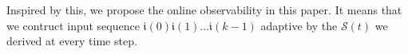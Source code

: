 \begin{comment}
 The input \Input$(t)$ we chose should make every two distinct states \State$^{i}(t)$ , \State$^{j}(t)$$\in$ \Ustate$(t)$ will not turn into be the same state after affected by \Input$(t)$.  \ly{Therefore,   there is exact one $s\in $ \Ustate$(t)$ such that $s\xrightarrow
{i(t)} s_1$ for each $s_1\in $ \Ustate$(t+1)$.} And the \Ustate$(t+1)$ is derived by the input \Input$(t)$ and \Output$(t+1)$, and we have $|$\Ustate$(t+1)$$|\le|$\Ustate$(t)$$|$. If $|$\Ustate$(t+1)$$|=1$,  we can determine \State$(t+1)$.  Employing the update rules and \Input$(t)$, we can determine the  \State$(t)$.  Repeating this step, we  determine the initial state \State$(0)$ of the \BCN.
\end{comment}

\begin{comment} 
But we can also determine the set of possible initial states \Ustate$(0)$ by initial output \Output$(0)$ we observe, and then we can use different input sequences (\Input$^{1}(0)$\Input$^{1}(1)\ldots$\Input$^{1}(k)$, \Input$^{2}(0)$\Input$^{2}(1)\ldots$\Input$^{2}(k)$, $\ldots$) to determine initial state for different sets of possible initial states (\Ustate$^{1}(0)$, \Ustate$^{2}(0)$, $\ldots$). In this case, the requirements for \BCNs\ to determine the initail state would be easier to satisfy. 
\end{comment}

Inspired by this, we propose the online observability in this paper. It means that we contruct input sequence $\mathfrak{i}(0)$$\mathfrak{i}(1)\ldots$$\mathfrak{i}(k-1)$ adaptive by the $\mathcal{S}(t)$ we derived at every time step. %

